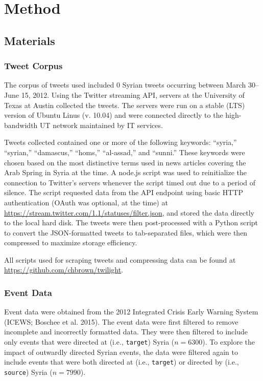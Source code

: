 \documentclass[
  english,
  man]{apa6}
\begin{document}
\hypertarget{method}{%
\section{Method}\label{method}}

\hypertarget{materials}{%
\subsection{Materials}\label{materials}}

\hypertarget{tweet-corpus}{%
\subsubsection{Tweet Corpus}\label{tweet-corpus}}

The corpus of tweets used included 0 Syrian tweets
occurring between March 30--June 15, 2012. Using the Twitter streaming API,
servers at the University of Texas at Austin collected the tweets. The servers
were run on a stable (LTS) version of Ubuntu Linus (v. 10.04) and were connected
directly to the high-bandwidth UT network maintained by IT services.

Tweets collected contained one or more of the following keywords: \enquote{syria,}
\enquote{syrian,} \enquote{damascus,} \enquote{homs,} \enquote{al-assad,} and \enquote{sunni.} These keywords were
chosen based on the most distinctive terms used in news articles covering the
Arab Spring in Syria at the time. A node.js script was used to reinitialize the
connection to Twitter's servers whenever the script timed out due to a period of
silence. The script requested data from the API endpoint using basic HTTP
authentication (OAuth was optional, at the time) at
\url{https://stream.twitter.com/1.1/statuses/filter.json}, and stored the data
directly to the local hard disk. The tweets were then post-processed with a
Python script to convert the JSON-formatted tweets to tab-separated files, which
were then compressed to maximize storage efficiency.

All scripts used for scraping tweets and compressing data can be found at
\url{https://github.com/chbrown/twilight}.

\hypertarget{event-data}{%
\subsubsection{Event Data}\label{event-data}}

Event data were obtained from the 2012 Integrated Crisis Early Warning System
(ICEWS; Boschee et al. 2015). The event data were first filtered to remove
incomplete and incorrectly formatted data. They were then filtered to include
only events that were directed at (i.e., \texttt{target}) Syria (\(n = 6300\)). To
explore the impact of outwardly directed Syrian events, the data were filtered
again to include events that were both directed at (i.e., \texttt{target}) or directed
by (i.e., \texttt{source}) Syria (\(n = 7990\)).
\end{document}
